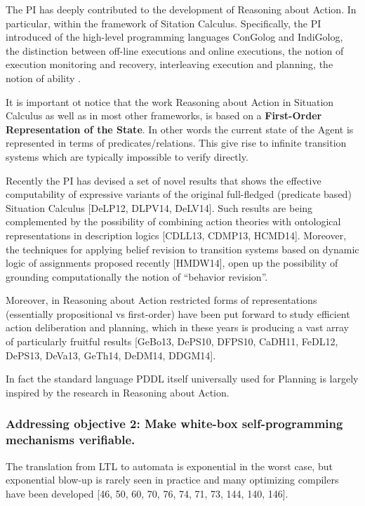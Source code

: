 The PI has deeply contributed to the development of Reasoning about
Action. In particular, within the framework of Sitation Calculus. Specifically, the PI
introduced of the high-level programming languages
ConGolog and IndiGolog, the
distinction between off-line executions and online executions, the
notion of execution monitoring and recovery, interleaving execution
and planning, the notion of ability \cite{DeGiacomoRS98,DeGiacomoLL00,SardinaGLL04,SardinaGLL06}.

It is important ot notice that the work Reasoning about Action in
Situation Calculus as well as in most other frameworks, is based on a
\textbf{First-Order Representation of the State}. In other words the
current state of the Agent is represented in terms of
predicates/relations.  This give rise to infinite transition systems
which are typically impossible to verify directly.

Recently the PI has devised a set of novel results
that shows the effective computability of expressive variants of the
original full-fledged (predicate based) Situation Calculus [DeLP12,
DLPV14, DeLV14]. Such results are being complemented by the
possibility of combining action theories with ontological
representations in description logics [CDLL13, CDMP13,
HCMD14]. Moreover, the techniques for applying belief revision to
transition systems based on dynamic logic of assignments proposed
recently [HMDW14], open up the possibility of grounding
computationally the notion of “behavior revision”.

Moreover, in Reasoning about Action restricted forms of representations
(essentially propositional vs first-order) have been put forward to study efficient
action deliberation and planning, which in these years is producing a
vast array of particularly fruitful results [GeBo13, DePS10, DFPS10,
CaDH11, FeDL12, DePS13, DeVa13, GeTh14, DeDM14, DDGM14].

In fact  the standard language PDDL itself universally used for Planning is largely inspired by the research in Reasoning about Action.

\subsubsection{Addressing objective 2: Make white-box self-programming mechanisms verifiable.}

The translation from LTL to automata is exponential in the worst case, but exponential blow-up is rarely seen in practice and many optimizing compilers have been developed [46, 50, 60, 70, 76, 74, 71, 73, 144, 140, 146].




